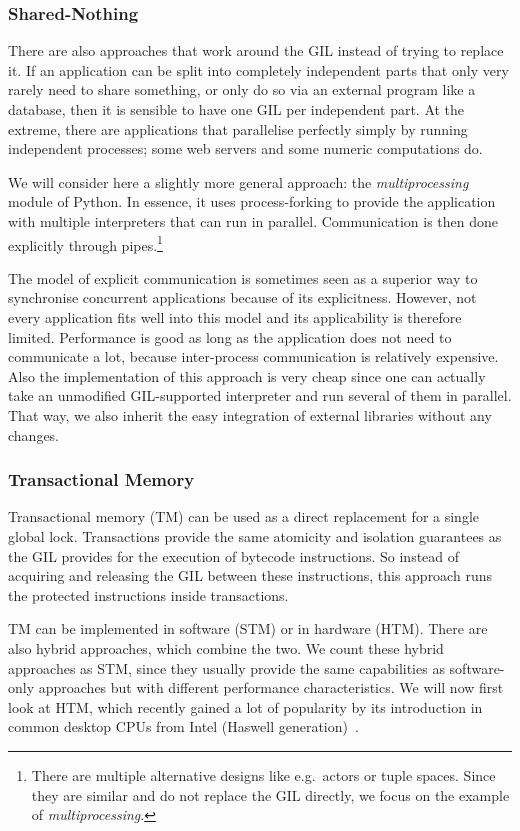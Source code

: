 \documentclass{sigplanconf}
\begin{document}
\subsubsection{Shared-Nothing}

There are also approaches that work around the GIL instead of trying
to replace it. If an application can be split into completely
independent parts that only very rarely need to share something, or
only do so via an external program like a database, then it is
sensible to have one GIL per independent part. At the extreme, there
are applications that parallelise perfectly simply by running
independent processes; some web servers and some numeric computations
do.

We will consider here a slightly more general approach: the
\emph{multiprocessing}~\cite{multiprocessing}
module of Python. In essence, it uses process-forking to provide the
application with multiple interpreters that can run in parallel.
Communication is then done explicitly through pipes.\footnote{There
are multiple alternative designs like e.g.\ actors or tuple spaces.
Since they are similar and do not replace the GIL directly, we
focus on the example of \emph{multiprocessing}.}

The model of explicit communication is sometimes seen as a superior
way to synchronise concurrent applications because of its explicitness.
However, not every application fits well into this model and its
applicability is therefore limited. Performance is good as
long as the application does not need to communicate a lot, because
inter-process communication is relatively expensive. Also the
implementation of this approach is very cheap since one can
actually take an unmodified GIL-supported interpreter and run
several of them in parallel. That way, we also inherit the
easy integration of external libraries without any changes.


\subsubsection{Transactional Memory}
Transactional memory (TM) can be used as a direct replacement for a
single global lock. Transactions provide the same atomicity and
isolation guarantees as the GIL provides for the execution of bytecode
instructions. So instead of acquiring and releasing the GIL between
these instructions, this approach runs the protected instructions
inside transactions.

TM can be implemented in software (STM) or in hardware (HTM). There
are also hybrid approaches, which combine the two. We count these
hybrid approaches as STM, since they usually provide the same
capabilities as software-only approaches but with different
performance characteristics. We will now first look at HTM, which
recently gained a lot of popularity by its introduction in common
desktop CPUs from Intel (Haswell generation)~\cite{odaira14,leis14}.
\end{document}

